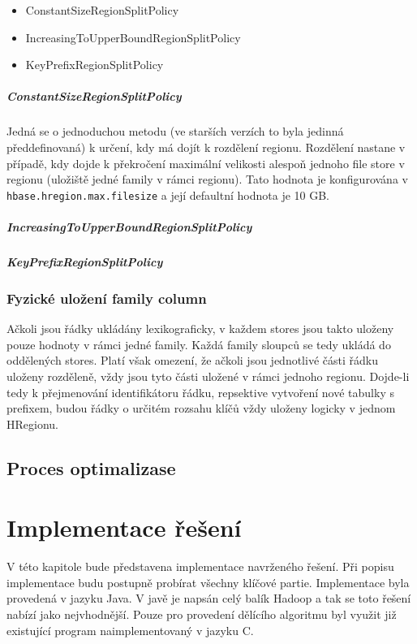 \documentclass[thesis=M,czech]{FITthesis}[2012/06/26]
\begin{document}
\begin{itemize}
	\item ConstantSizeRegionSplitPolicy
	\item IncreasingToUpperBoundRegionSplitPolicy
	\item KeyPrefixRegionSplitPolicy
\end{itemize} 

\paragraph{ConstantSizeRegionSplitPolicy}
Jedná se o jednoduchou metodu (ve starších verzích to byla jedinná předdefinovaná) k určení, kdy má dojít k rozdělení regionu. Rozdělení nastane v případě, kdy dojde k překročení maximální velikosti alespoň jednoho file store v regionu (uložiště jedné family v rámci regionu). Tato hodnota je konfigurována v \texttt{hbase.hregion.max.filesize} a její defaultní hodnota je 10 GB. 

\paragraph{IncreasingToUpperBoundRegionSplitPolicy}

\paragraph{KeyPrefixRegionSplitPolicy}

\subsection{Fyzické uložení family column}
Ačkoli jsou řádky ukládány lexikograficky, v každem stores jsou takto uloženy pouze hodnoty v rámci jedné family. Každá family sloupců se tedy ukládá do oddělených stores. Platí však omezení, že ačkoli jsou jednotlivé části řádku uloženy rozděleně, vždy jsou tyto části uložené v rámci jednoho regionu. Dojde-li tedy k přejmenování identifikátoru řádku, repsektive vytvoření nové tabulky s prefixem, budou řádky o určitém rozsahu klíčů vždy uloženy logicky v jednom HRegionu.

\section{Proces optimalizase}


\chapter{Implementace řešení}
V této kapitole bude představena implementace navrženého řešení. Při popisu implementace budu postupně probírat všechny klíčové partie. Implementace byla provedená v jazyku Java. V javě je napsán celý balík Hadoop a tak se toto řešení nabízí jako nejvhodnější. Pouze pro provedení dělícího algoritmu byl využit již existující program naimplementovaný v jazyku C. 
\end{document}
